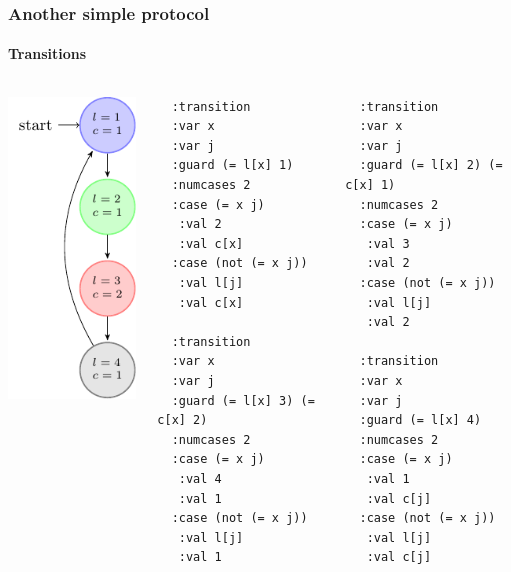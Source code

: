 \begin{frame}[fragile]
  \frametitle{Another simple protocol}
  \framesubtitle{Transitions}

\begin{columns}
\begin{column}{0.3\textwidth}
\centering
\includegraphics{pictures/demo-prot2-fig}
\end{column}
\begin{column}{0.7\textwidth}
  
\begin{columns}
\begin{column}{0.35\textwidth}
 {\tiny 
  \begin{verbatim}
  :transition
  :var x
  :var j
  :guard (= l[x] 1) 
  :numcases 2
  :case (= x j)
   :val 2
   :val c[x]
  :case (not (= x j))
   :val l[j]
   :val c[x]

  :transition
  :var x
  :var j
  :guard (= l[x] 3) (= c[x] 2)
  :numcases 2
  :case (= x j)
   :val 4
   :val 1
  :case (not (= x j))
   :val l[j]
   :val 1
 \end{verbatim}
 }
\end{column}
\begin{column}{0.35\textwidth}
 {\tiny 
  \begin{verbatim}
  :transition
  :var x
  :var j
  :guard (= l[x] 2) (= c[x] 1)
  :numcases 2
  :case (= x j)
   :val 3
   :val 2
  :case (not (= x j))
   :val l[j]
   :val 2
  
  :transition
  :var x
  :var j
  :guard (= l[x] 4) 
  :numcases 2
  :case (= x j)
   :val 1
   :val c[j]
  :case (not (= x j))
   :val l[j]
   :val c[j]
 \end{verbatim}
 }
\end{column}

\end{columns}  

\end{column}

\end{columns}

\end{frame}






